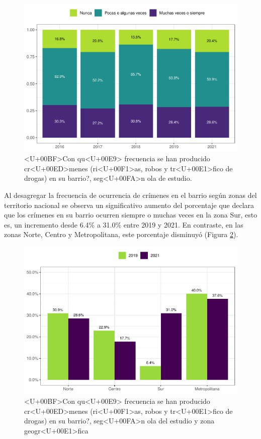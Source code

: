 \documentclass[
  12pt,
]{book}
\begin{document}
\begin{figure}

{\centering \includegraphics{reporte-elsoc_files/figure-latex/crim-olas-1} 

}

\caption{<U+00BF>Con qu<U+00E9> frecuencia se han producido cr<U+00ED>menes (ri<U+00F1>as, robos y tr<U+00E1>fico de drogas) en su barrio?, seg<U+00FA>n ola de estudio.}\label{fig:crim-olas}
\end{figure}

Al desagregar la frecuencia de ocurrencia de crímenes en el barrio según zonas del territorio nacional se observa un significativo aumento del porcentaje que declara que los crímenes en su barrio ocurren siempre o muchas veces en la zona Sur, esto es, un incremento desde 6.4\% a 31.0\% entre 2019 y 2021. En contraste, en las zonas Norte, Centro y Metropolitana, este porcentaje disminuyó (Figura \ref{fig:crim-zona}).

\begin{figure}

{\centering \includegraphics{reporte-elsoc_files/figure-latex/crim-zona-1} 

}

\caption{<U+00BF>Con qu<U+00E9> frecuencia se han producido cr<U+00ED>menes (ri<U+00F1>as, robos y tr<U+00E1>fico de drogas) en su barrio?, seg<U+00FA>n ola del estudio y zona geogr<U+00E1>fica}\label{fig:crim-zona}
\end{figure}
\end{document}
